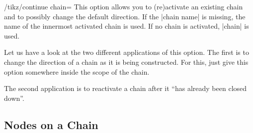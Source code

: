 \begin{key}{/tikz/continue chain=}
    This option allows you to (re)activate an existing chain and to possibly
    change the default direction. If the |chain name| is missing, the name of
    the innermost activated chain is used. If no chain is activated, |chain| is
    used.

    Let us have a look at the two different applications of this option. The
    first is to change the direction of a chain as it is being constructed. For
    this, just give this option somewhere inside the scope of the chain.
\begin{codeexample}[preamble={\usetikzlibrary{chains}}]
\end{codeexample}

    The second application is to reactivate a chain after it ``has already been
    closed down''.
\begin{codeexample}[preamble={\usetikzlibrary{chains,scopes}}]
\end{codeexample}
\end{key}


\subsection{Nodes on a Chain}

